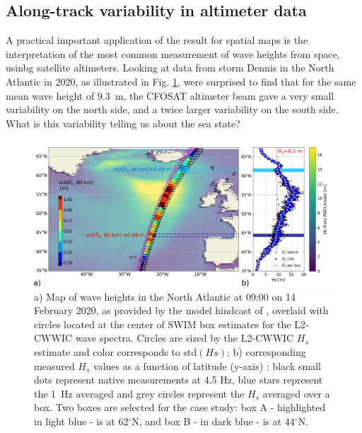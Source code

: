 {\subsection{Along-track variability in altimeter data}
A practical important application of the result for spatial maps is the interpretation of the most common measurement of wave heights from space, usinbg satellite altimeters. Looking at data from storm Dennis in the North Atlantic in 2020, as illustrated in Fig. \ref{figure:groups_storm1}, \cite{DeCarlo&al.2023} were surprised to find that for the same mean wave height of 9.3~m, the CFOSAT altimeter beam gave a very small variability on the north side, and a twice larger variability on the south side. What is this variability telling us about the sea state? 
\begin{figure}[h!]
\centerline{\includegraphics[width=\textwidth]{FIGS_CH_GROUPS/DeCarlo_fig1.pdf}}
    \caption{a) Map of wave heights in the North Atlantic at 09:00 on 14 February 2020, as provided by the model hindcast of \cite{Alday&al.2021}, overlaid with circles located at the center of SWIM box estimates for the L2-CWWIC wave spectra. Circles are sized by the L2-CWWIC $H_s$ estimate and color corresponds to $\mathrm{std}(Hs)$; b) corresponding measured $H_s$ values as a function of latitude (y-axis) : black small dots represent native measurements at 4.5 Hz, blue stars represent the 1~Hz averaged and grey circles represent the $H_s$ averaged over a box. Two boxes are selected for the case study: box A - highlighted in light blue - is at 62$^\circ$N, and box B - in dark blue - is at 44$^\circ$N.} 
   \label{figure:groups_storm1}
\end{figure}

}

